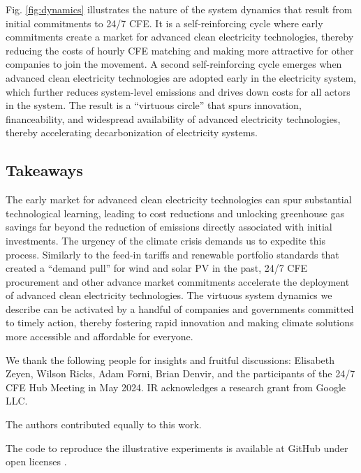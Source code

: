 \documentclass[pdflatex,sn-basic, Numbered]{sn-jnl}
\theoremstyle{thmstyleone}%
\theoremstyle{thmstyletwo}%
\theoremstyle{thmstylethree}%
\begin{document}
Fig. \ref{fig:dynamics} illustrates the nature of the system dynamics that result from initial commitments to 24/7 CFE. It is a self-reinforcing cycle where early commitments create a market for advanced clean electricity technologies, thereby reducing the costs of hourly CFE matching and making more attractive for other companies to join the movement. A second self-reinforcing cycle emerges when advanced clean electricity technologies are adopted early in the electricity system, which further reduces system-level emissions and drives down costs for all actors in the system. The result is a \enquote{virtuous circle} that spurs innovation, financeability, and widespread availability of advanced electricity technologies, thereby accelerating decarbonization of electricity systems.

\subsection*{Takeaways}\label{sec6}

The early market for advanced clean electricity technologies can spur substantial technological learning, leading to cost reductions and unlocking greenhouse gas savings far beyond the reduction of emissions directly associated with initial investments.
The urgency of the climate crisis demands us to expedite this process.
Similarly to the feed-in tariffs and renewable portfolio standards that created a \enquote{demand pull} for wind and solar PV in the past, 24/7 CFE procurement and other advance market commitments \cite{GoogleMicrosoftNucor} accelerate the deployment of advanced clean electricity technologies.
The virtuous system dynamics we describe can be activated by a handful of companies and governments committed to timely action, thereby fostering rapid innovation and making climate solutions more accessible and affordable for everyone.

\backmatter

 We thank the following people for insights and fruitful discussions: Elisabeth Zeyen, Wilson Ricks, Adam Forni, Brian Denvir, and the participants of the 24/7 CFE Hub Meeting in May 2024. IR acknowledges a research grant from Google LLC.

 The authors contributed equally to this work.

 The code to reproduce the illustrative experiments is available at GitHub under open licenses \cite{code247CFE}.
\end{document}
